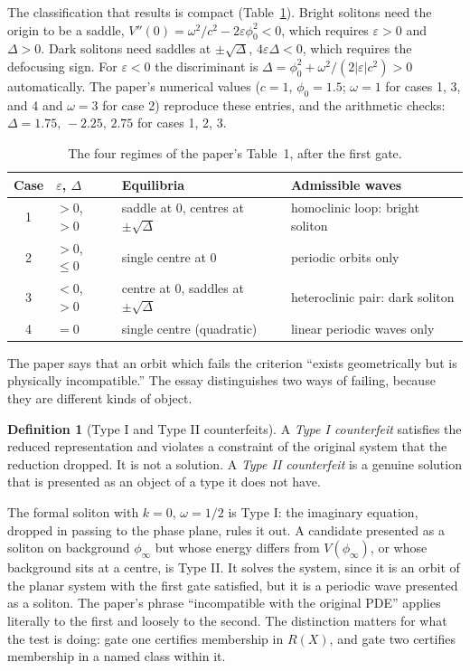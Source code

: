 \documentclass[11pt]{article}
\theoremstyle{definition}
\newtheorem{definition}{Definition}
\theoremstyle{remark}
\begin{document}
The classification that results is compact (Table~\ref{tab:cases}). Bright solitons need the origin to be a saddle, $V''(0)=\omega^2/c^2-2\varepsilon\phi_0^2<0$, which requires $\varepsilon>0$ and $\Delta>0$. Dark solitons need saddles at $\pm\sqrt\Delta$, $4\varepsilon\Delta<0$, which requires the defocusing sign. For $\varepsilon<0$ the discriminant is $\Delta=\phi_0^2+\omega^2/(2|\varepsilon|c^2)>0$ automatically. The paper's numerical values ($c=1$, $\phi_0=1.5$; $\omega=1$ for cases 1, 3, and 4 and $\omega=3$ for case 2) reproduce these entries, and the arithmetic checks: $\Delta=1.75,\,-2.25,\,2.75$ for cases 1, 2, 3.

\begin{table}[t]
\centering
\small
\begin{tabular}{@{}clll@{}}
\toprule
Case & $\varepsilon$, $\Delta$ & Equilibria & Admissible waves \\
\midrule
1 & $>0$, $>0$ & saddle at 0, centres at $\pm\sqrt\Delta$ & homoclinic loop: bright soliton \\
2 & $>0$, $\le0$ & single centre at 0 & periodic orbits only \\
3 & $<0$, $>0$ & centre at 0, saddles at $\pm\sqrt\Delta$ & heteroclinic pair: dark soliton \\
4 & $=0$ & single centre (quadratic) & linear periodic waves only \\
\bottomrule
\end{tabular}
\caption{The four regimes of the paper's Table~1, after the first gate.}
\label{tab:cases}
\end{table}

The paper says that an orbit which fails the criterion ``exists geometrically but is physically incompatible.'' The essay distinguishes two ways of failing, because they are different kinds of object.

\begin{definition}[Type I and Type II counterfeits]
A \emph{Type I counterfeit} satisfies the reduced representation and violates a constraint of the original system that the reduction dropped. It is not a solution. A \emph{Type II counterfeit} is a genuine solution that is presented as an object of a type it does not have.
\end{definition}

The formal soliton with $k=0$, $\omega=1/2$ is Type I: the imaginary equation, dropped in passing to the phase plane, rules it out. A candidate presented as a soliton on background $\phi_\infty$ but whose energy differs from $V(\phi_\infty)$, or whose background sits at a centre, is Type II. It solves the system, since it is an orbit of the planar system with the first gate satisfied, but it is a periodic wave presented as a soliton. The paper's phrase ``incompatible with the original PDE'' applies literally to the first and loosely to the second. The distinction matters for what the test is doing: gate one certifies membership in $R(X)$, and gate two certifies membership in a named class within it.
\end{document}
